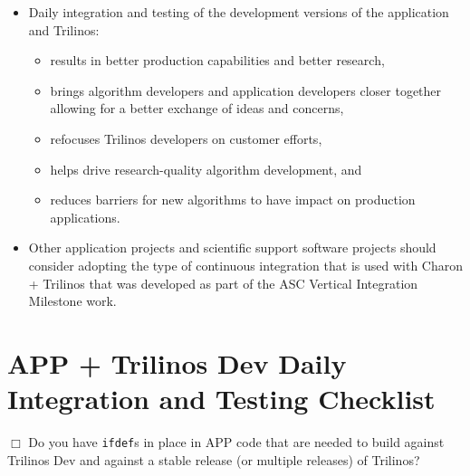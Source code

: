 \documentclass[pdf,ps2pdf,11pt]{SANDreport}
\begin{document}
\begin{itemize}

{}\item Daily integration and testing of the development versions of the
application and Trilinos:

  \begin{itemize}

  {}\item results in better production capabilities and better research,

  {}\item brings algorithm developers and application developers closer
  together allowing for a better exchange of ideas and concerns,

  {}\item refocuses Trilinos developers on customer efforts,

  {}\item helps drive research-quality algorithm development, and
        
  {}\item reduces barriers for new algorithms to have impact on production
  applications.

  \end{itemize}

{}\item Other application projects and scientific support software projects
should consider adopting the type of continuous integration that is used with
Charon + Trilinos that was developed as part of the ASC Vertical Integration
Milestone work.

\end{itemize}

%
\clearpage



%
\appendix


%
\section*{APP + Trilinos Dev Daily Integration and Testing Checklist}
\label{sec:checkist}
%

$\Box$ Do you have {}\texttt{ifdef}s in place in APP code that are needed to
build against Trilinos Dev and against a stable release (or multiple releases)
of Trilinos?
\end{document}
